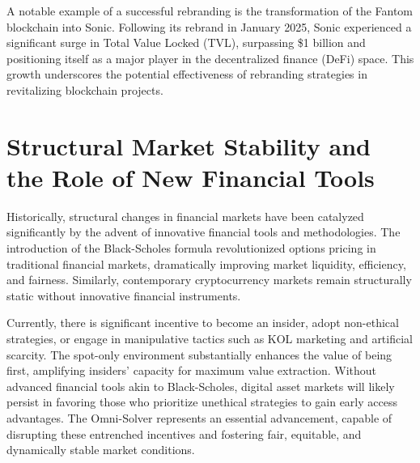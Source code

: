 \documentclass{article}
\begin{document}
A notable example of a successful rebranding is the transformation of the Fantom blockchain into Sonic. Following its rebrand in January 2025, Sonic experienced a significant surge in Total Value Locked (TVL), surpassing \$1 billion and positioning itself as a major player in the decentralized finance (DeFi) space. This growth underscores the potential effectiveness of rebranding strategies in revitalizing blockchain projects.

\section{Structural Market Stability and the Role of New Financial Tools}

Historically, structural changes in financial markets have been catalyzed significantly by the advent of innovative financial tools and methodologies. The introduction of the Black-Scholes formula revolutionized options pricing in traditional financial markets, dramatically improving market liquidity, efficiency, and fairness. Similarly, contemporary cryptocurrency markets remain structurally static without innovative financial instruments.

Currently, there is significant incentive to become an insider, adopt non-ethical strategies, or engage in manipulative tactics such as KOL marketing and artificial scarcity. The spot-only environment substantially enhances the value of being first, amplifying insiders' capacity for maximum value extraction. Without advanced financial tools akin to Black-Scholes, digital asset markets will likely persist in favoring those who prioritize unethical strategies to gain early access advantages. The Omni-Solver represents an essential advancement, capable of disrupting these entrenched incentives and fostering fair, equitable, and dynamically stable market conditions.
\end{document}
